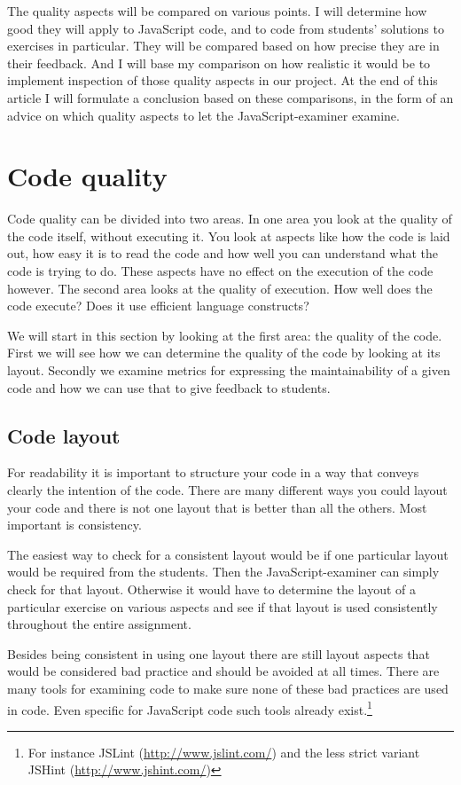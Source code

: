 \documentclass{article}
\begin{document}
The quality aspects will be compared on various points. I will determine how
good they will apply to JavaScript code, and to code from students' solutions
to exercises in particular. They will be compared based on how precise they are
in their feedback. And I will base my comparison on how realistic it would be
to implement inspection of those quality aspects in our project. At the end of
this article I will formulate a conclusion based on these comparisons, in the
form of an advice on which quality aspects to let the JavaScript-examiner
examine.

\section{Code quality}

Code quality can be divided into two areas. In one area you look at the quality
of the code itself, without executing it. You look at aspects like how the code
is laid out, how easy it is to read the code and how well you can understand
what the code is trying to do. These aspects have no effect on the execution of
the code however. The second area looks at the quality of execution. How well
does the code execute? Does it use efficient language constructs?

We will start in this section by looking at the first area: the quality of the
code. First we will see how we can determine the quality of the code by looking
at its layout. Secondly we examine metrics for expressing the maintainability
of a given code and how we can use that to give feedback to students.

\subsection{Code layout}

For readability it is important to structure your code in a way that conveys clearly the intention of the code. There are many different ways you could layout your code and there is not one layout that is better than all the others. Most important is consistency.

The easiest way to check for a consistent layout would be if one particular layout would be required from the students. Then the JavaScript-examiner can simply check for that layout. Otherwise it would have to determine the layout of a particular exercise on various aspects and see if that layout is used consistently throughout the entire assignment.

Besides being consistent in using one layout there are still layout aspects
that would be considered bad practice and should be avoided at all times. There
are many tools for examining code to make sure none of these bad practices are
used in code. Even specific for JavaScript code such tools already
exist.\footnote{For instance JSLint (\url{http://www.jslint.com/}) and the less
strict variant JSHint (\url{http://www.jshint.com/})}
\end{document}
